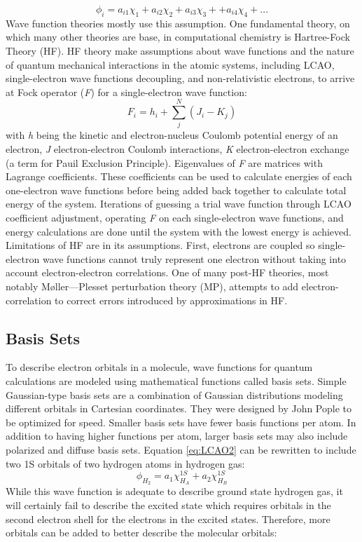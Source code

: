 \documentclass[
journal=jpcbfk, %
manuscript=article]{achemso}
\begin{document}
	\begin{equation}
	\label{eq:LCAO2}
	\phi_{i} =a_{i1}\chi_{1}+a_{i2}\chi_{2}+a_{i3}\chi_{3}++a_{i4}\chi_{4}+...
	\end{equation}
	Wave function theories mostly use this assumption. One fundamental theory, on which many other theories are base, in computational chemistry is Hartree-Fock Theory (HF). HF theory make assumptions about wave functions and the nature of quantum mechanical interactions in the atomic systems, including LCAO, single-electron wave functions decoupling, and non-relativistic electrons, to arrive at Fock operator (\textit{F}) for a single-electron wave function:
		\begin{equation}
		\label{eq:Fock}
		F_{i}=h_{i}+\sum_{j}^{N}(J_{i}-K_{j})
		\end{equation}
	with \textit{h} being the kinetic and electron-nucleus Coulomb potential energy of an electron, \textit{J} electron-electron Coulomb interactions, \textit{K} electron-electron exchange (a term for Pauil Exclusion Principle). Eigenvalues of \textit{F} are matrices with Lagrange coefficients. These coefficients can be used to calculate energies of each one-electron wave functions before being added back together to calculate total energy of the system. Iterations of guessing a trial wave function through LCAO coefficient adjustment, operating \textit{F} on each single-electron wave functions, and energy calculations are done until the system with the lowest energy is achieved. Limitations of HF are in its assumptions. First, electrons are coupled so single-electron wave functions cannot truly represent one electron without taking into account electron-electron correlations. One of many post-HF theories, most notably M{\o}ller---Plesset perturbation theory (MP)\cite{Møller1934}, attempts to add electron-correlation to correct errors introduced by approximations in HF. 
	
	\subsection{Basis Sets}
	To describe electron orbitals in a molecule, wave functions for quantum calculations are modeled using mathematical functions called basis sets. Simple Gaussian-type basis sets are a combination of Gaussian distributions modeling different orbitals in Cartesian coordinates. They were designed by John Pople to be optimized for speed.\cite{Hehre1986} Smaller basis sets have fewer basis functions per atom. In addition to having higher functions per atom, larger basis sets may also include polarized and diffuse basis sets. Equation \ref{eq:LCAO2} can be rewritten to include two 1S orbitals of two hydrogen atoms in hydrogen gas:
	\begin{equation}
	\label{eq:basisSet1}
	\phi_{H_{2}} =a_{1}\chi^{1S}_{H_{A}}+a_{2}\chi^{1S}_{H_{B}}
	\end{equation}
	While this wave function is adequate to describe ground state hydrogen gas, it will certainly fail to describe the excited state which requires  orbitals in the second electron shell for the electrons in the excited states. Therefore, more orbitals can be added to better describe the molecular orbitals:
	
\end{document}
